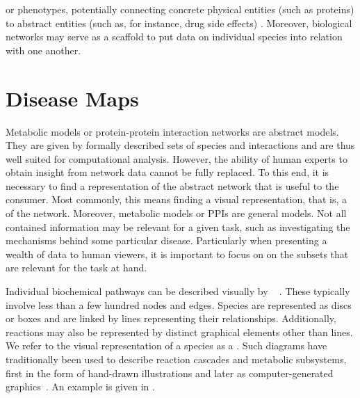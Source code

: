\documentclass[
	fontsize=10pt, %
	twoside=true, %
	secnumdepth=1, %
  toc=indentunnumbered %
]{kaobook}
\begin{document}
or phenotypes, potentially connecting concrete physical entities (such as
proteins) to abstract entities (such as, for instance, drug side effects)
\cite{ruiz_identification_2021, barabasi_NetworkMedicineNetworkbased_2011}.
Moreover, biological networks
may serve as a scaffold to put data on individual species into relation with one
another.

\section{Disease Maps}


Metabolic models or protein-protein interaction networks are abstract models.
They are given by formally described sets of species and interactions and are
thus well suited for computational analysis. However, the ability of human
experts to obtain insight from network data cannot be fully replaced. To this
end, it is necessary to find a representation of the abstract network that is
useful to the consumer. Most commonly, this means finding a visual
representation, that is, a  of the network. Moreover, metabolic
models or PPIs are general models. Not all contained information may be relevant
for a given task, such as investigating the mechanisms behind some particular
disease. Particularly when presenting a wealth of data to human viewers, it is
important to focus on on the subsets that are relevant for the task at hand.

Individual biochemical pathways can be described visually by ~\cite{siebenhaller_HumanlikeLayoutAlgorithms_2020} .
These typically involve less than a few hundred nodes and edges. Species are
represented as discs or boxes and are linked by lines representing their
relationships. Additionally, reactions may also be represented by distinct
graphical elements other than lines. We refer to the visual representation of a
species as a . Such diagrams have traditionally been used to
describe reaction cascades and metabolic subsystems, first in the form of
hand-drawn illustrations and later as computer-generated
graphics~\cite{becker_GraphLayoutAlgorithm_2001,paley_PathwayToolsCellular_2006,droste_SemiautomaticDrawingMetabolic_2012}. An example is given in .
\end{document}
